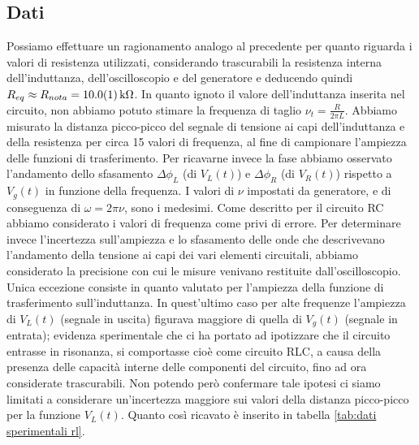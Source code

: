 \documentclass[a4paper]{article}
\begin{document}
\subsection{Dati}
Possiamo effettuare un ragionamento analogo al precedente per quanto riguarda i valori di resistenza utilizzati, considerando trascurabili la resistenza interna dell'induttanza, dell'oscilloscopio e del generatore e deducendo quindi $R_{eq} \approx R_{nota} = \SI{10.0 \pm 0.1}{k\ohm}$. In quanto ignoto il valore dell'induttanza inserita nel circuito, non abbiamo potuto stimare la frequenza di taglio $\nu_t = \frac{R}{2\pi L}$. Abbiamo misurato la distanza picco-picco del segnale di tensione ai capi dell'induttanza e della resistenza per circa 15 valori di frequenza, al fine di campionare l'ampiezza delle funzioni di trasferimento. Per ricavarne invece la fase abbiamo osservato l'andamento dello sfasamento $\Delta\phi_L$ (di $V_L(t)$) e $\Delta\phi_R$ (di $V_R(t)$) rispetto a $V_g(t)$ in funzione della frequenza. I valori di $\nu$ impostati da generatore, e di conseguenza di $\omega = 2\pi \nu$, sono i medesimi. Come descritto per il circuito RC abbiamo considerato i valori di frequenza come privi di errore. Per determinare invece l'incertezza sull'ampiezza e lo sfasamento delle onde che descrivevano l'andamento della tensione ai capi dei vari elementi circuitali, abbiamo considerato la precisione con cui le misure venivano restituite dall'oscilloscopio. Unica eccezione consiste in quanto valutato per l'ampiezza della funzione di trasferimento sull'induttanza. In quest'ultimo caso per alte frequenze l'ampiezza di $V_L(t)$ (segnale in uscita) figurava maggiore di quella di $V_g(t)$ (segnale in entrata); evidenza sperimentale che ci ha portato ad ipotizzare che il circuito entrasse in risonanza, si comportasse cioè come circuito RLC, a causa della presenza delle capacità interne delle componenti del circuito, fino ad ora considerate trascurabili. Non potendo però confermare tale ipotesi ci siamo limitati a considerare un'incertezza maggiore sui valori della distanza picco-picco per la funzione $V_L(t)$. Quanto così ricavato è inserito in tabella \ref{tab:dati sperimentali rl}.
\end{document}
